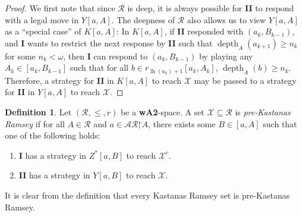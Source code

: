 \documentclass[11pt,reqno]{amsart}
\theoremstyle{plain}
\numberwithin{equation}{section}
\theoremstyle{definition}
\newtheorem{definition}[theorem]{Definition}
\newcommand{\func}{\operatorname}
\newcommand{\cal}{\mathcal}
\newcommand{\restrictedto}{\mathord{\upharpoonright}}
\newcommand{\X}{\cal{X}}
\newcommand{\lh}{\func{lh}}
\newcommand{\depth}{\func{depth}}
\begin{document}
\begin{proof}
    We first note that since $\cal{R}$ is deep, it is always possible for \textbf{II} to respond with a legal move in $Y[a,A]$. The deepness of $\cal{R}$ also allows us to view $Y[a,A]$ as a ``special case'' of $K[a,A]$: In $K[a,A]$, if \textbf{II} responded with $(a_k,B_{k-1})$, and \textbf{I} wants to restrict the next response by \textbf{II} such that $\depth_A(a_{k+1}) \geq n_k$ for some $n_k < \omega$, then \textbf{I} can respond to $(a_k,B_{k-1})$ by playing any $A_k \in [a_k,B_{k-1}]$ such that for all $b \in r_{\lh(a_k)+1}[a_k,A_k]$, $\depth_A(b) \geq n_k$. Therefore, a strategy for \textbf{II} in $K[a,A]$ to reach $\X$ may be passed to a strategy for \textbf{II} in $Y[a,A]$ to reach $\X$.
\end{proof}

\begin{definition}
    Let $(\cal{R},\leq,r)$ be a \textbf{wA2}-space. A set $\X \subseteq \cal{R}$ is \emph{pre-Kastanas Ramsey} if for all $A \in \cal{R}$ and $a \in \cal{AR}\restrictedto A$, there exists some $B \in [a,A]$ such that one of the following holds:
    \begin{enumerate}
        \item \textbf{I} has a strategy in $Z^*[a,B]$ to reach $\X^c$.

        \item \textbf{II} has a strategy in $Y[a,B]$ to reach $\X$.
    \end{enumerate}
\end{definition}

It is clear from the definition that every Kastanas Ramsey set is pre-Kastanas Ramsey. 
\end{document}
